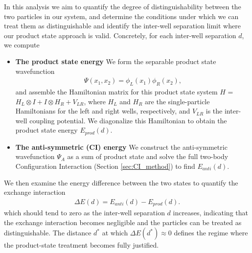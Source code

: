 \documentclass{subfiles}
\begin{document}
In this analysis we aim to quantify the degree of distinguishability between the two particles in our system, and determine the conditions under which we can treat them as distinguishable and identify the inter-well separation limit where our product state approach is valid. Concretely, for each inter-well separation $d$, we compute
\begin{itemize}
    \item \textbf{The product state energy}
    We form the separable product state wavefunction
    \begin{align*}
        \Psi(x_1, x_2) = \phi_L(x_1)\phi_R(x_2),
    \end{align*}
    and assemble the Hamiltonian matrix for this product state system $H$ = $H_L\otimes I + I \otimes H_R + V_{LR}$, where $H_L$ and $H_R$ are the single-particle Hamiltonians for the left and right wells, respectively, and $V_{LR}$ is the inter-well coupling potential. We diagonalize this Hamiltonian to obtain the product state energy $E_{prod}(d)$.
    \item \textbf{The anti-symmetric (CI) energy}
    We construct the anti-symmetric wavefunction $\Psi_A$ as a sum of product state and solve the full two-body Configuration Interaction (Section \ref{sec:CI_method}) to find $E_{anti}(d)$. 
\end{itemize}
We then examine the energy difference between the two states to quantify the exchange interaction
\begin{align*}
    \Delta E(d) = E_{anti}(d) - E_{prod}(d).
\end{align*}
which should tend to zero as the inter-well separation $d$ increases, indicating that the exchange interaction becomes negligible and the particles can be treated as distinguishable. The distance $d^*$ at which $\Delta E(d^*) \approx 0$ defines the regime where the product-state treatment becomes fully justified.


\end{document}
